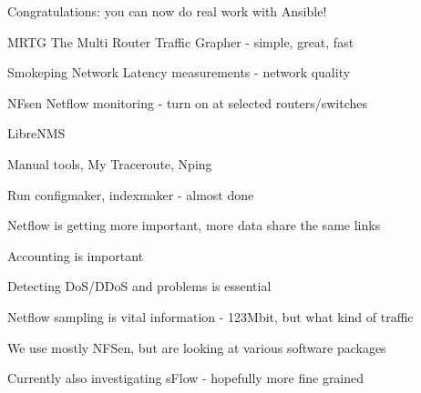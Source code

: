 \documentclass[Screen16to9,17pt]{foils}
\begin{document}
\vskip 5mm
\centerline{Congratulations: you can now do real work with Ansible!}



\begin{slidelist}
\item MRTG The Multi Router Traffic Grapher - simple, great, fast\\
\item Smokeping Network Latency measurements - network quality\\
\item NFsen Netflow monitoring - turn on at selected routers/switches
\item LibreNMS 
\item Manual tools, My Traceroute, Nping
\end{slidelist}



\centerline{Run configmaker, indexmaker - almost done}






\begin{slidelist}
\item Netflow is getting more important, more data share the same links
\item Accounting is important
\item Detecting DoS/DDoS and problems is essential
\item Netflow sampling is vital information - 123Mbit, but what kind of traffic
\item We use mostly NFSen, but are looking at various software packages
\item Currently also investigating sFlow - hopefully more fine grained
\end{slidelist}



\end{document}
